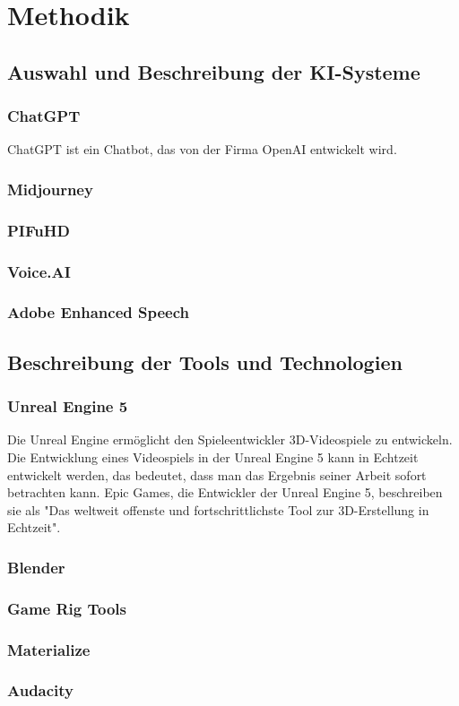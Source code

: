 \chapter{Methodik}

\section{Auswahl und Beschreibung der KI-Systeme}
\subsection{ChatGPT}
ChatGPT ist ein Chatbot, das von der Firma OpenAI entwickelt wird.
\subsection{Midjourney}
\subsection{PIFuHD}
\subsection{Voice.AI}
\subsection{Adobe Enhanced Speech}

\section{Beschreibung der Tools und Technologien}
\subsection{Unreal Engine 5}
Die Unreal Engine ermöglicht den Spieleentwickler 3D-Videospiele zu entwickeln. Die Entwicklung eines Videospiels in der Unreal Engine 5 kann in Echtzeit entwickelt werden, das bedeutet, dass man das Ergebnis seiner Arbeit sofort betrachten kann. Epic Games, die Entwickler der Unreal Engine 5, beschreiben sie als "Das weltweit offenste und fortschrittlichste Tool zur 3D-Erstellung in Echtzeit".
\subsection{Blender}
\subsection{Game Rig Tools}
\subsection{Materialize}
\subsection{Audacity}
